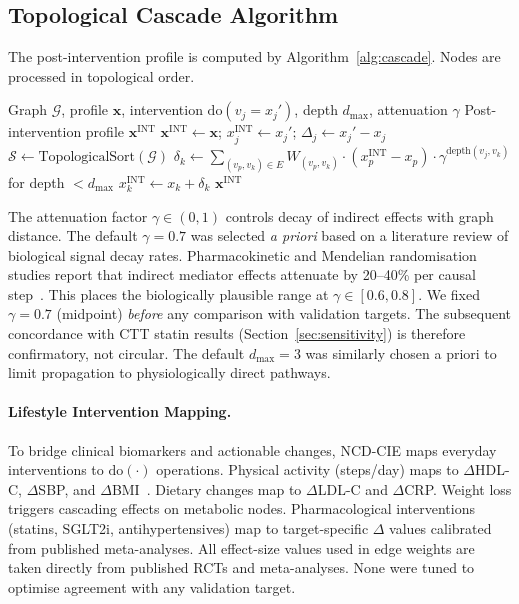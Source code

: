\documentclass[runningheads]{llncs}
\begin{document}
\subsection{Topological Cascade Algorithm}\label{sec:cascade}

The post-intervention profile is computed by
Algorithm~\ref{alg:cascade}.
Nodes are processed in topological order.

\begin{algorithm}[t]
\caption{Topological Intervention Cascade}
\label{alg:cascade}
\begin{algorithmic}[1]
\REQUIRE Graph $\mathcal{G}$, profile $\mathbf{x}$, intervention
  $\mathrm{do}(v_j = x_j')$, depth $d_{\max}$, attenuation $\gamma$
\ENSURE Post-intervention profile $\mathbf{x}^{\mathrm{INT}}$
\STATE $\mathbf{x}^{\mathrm{INT}} \leftarrow \mathbf{x}$;
  $x_j^{\mathrm{INT}} \leftarrow x_j'$;
  $\Delta_j \leftarrow x_j' - x_j$
\STATE $\mathcal{S} \leftarrow \text{TopologicalSort}(\mathcal{G})$
  \STATE $\delta_k \leftarrow \sum_{(v_p, v_k) \in E} W_{(v_p,v_k)} \cdot (x_p^{\mathrm{INT}} - x_p) \cdot \gamma^{\text{depth}(v_j,v_k)}$ for depth $< d_{\max}$
  \STATE $x_k^{\mathrm{INT}} \leftarrow x_k + \delta_k$
\ENDFOR
\RETURN $\mathbf{x}^{\mathrm{INT}}$
\end{algorithmic}
\end{algorithm}

The attenuation factor $\gamma \in (0,1)$ controls decay of indirect
effects with graph distance.
The default $\gamma = 0.7$ was selected \emph{a priori} based on a
literature review of biological signal decay rates.
Pharmacokinetic and Mendelian randomisation studies report that
indirect mediator effects attenuate by 20--40\% per causal
step~\cite{ctt2010,pearl2009causality}.
This places the biologically plausible range at
$\gamma \in [0.6, 0.8]$.
We fixed $\gamma = 0.7$ (midpoint) \emph{before} any comparison with
validation targets.
The subsequent concordance with CTT statin results
(Section~\ref{sec:sensitivity}) is therefore confirmatory, not
circular.
The default $d_{\max} = 3$ was similarly chosen a priori to limit
propagation to physiologically direct pathways.

\paragraph{Lifestyle Intervention Mapping.}
To bridge clinical biomarkers and actionable changes, NCD-CIE maps
everyday interventions to $\mathrm{do}(\cdot)$ operations.
Physical activity (steps/day) maps to $\Delta$HDL-C, $\Delta$SBP,
and $\Delta$BMI~\cite{naci2018comparative}.
Dietary changes map to $\Delta$LDL-C and $\Delta$CRP\@.
Weight loss triggers cascading effects on metabolic nodes.
Pharmacological interventions (statins, SGLT2i, antihypertensives)
map to target-specific $\Delta$ values calibrated from published
meta-analyses.
All effect-size values used in edge weights are taken directly from
published RCTs and meta-analyses.
None were tuned to optimise agreement with any validation target.
\end{document}
